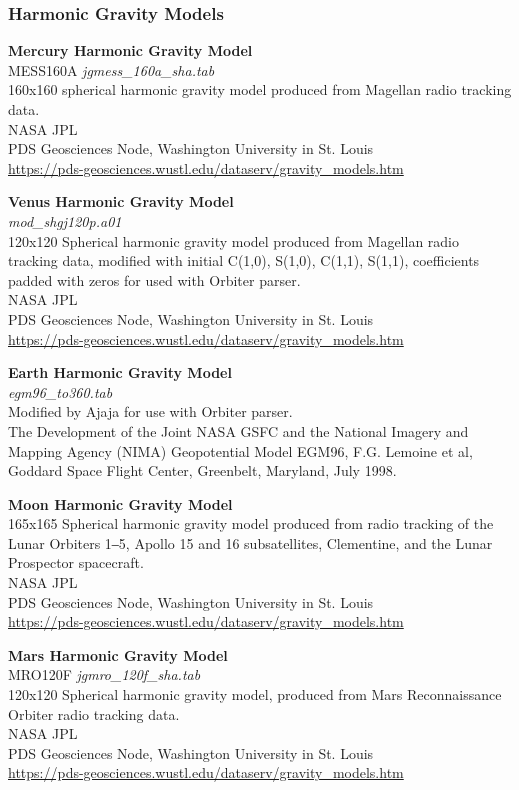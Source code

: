 \documentclass[Orbiter User Manual.tex]{subfiles}
\begin{document}
\subsubsection{Harmonic Gravity Models}
\textbf{Mercury Harmonic Gravity Model}\\
MESS160A	\textit{jgmess\_160a\_sha.tab}\\
160x160 spherical harmonic gravity model produced from Magellan radio tracking
data.\\
NASA JPL\\
PDS Geosciences Node, Washington University in St. Louis\\
\url{https://pds-geosciences.wustl.edu/dataserv/gravity_models.htm}

\textbf{Venus Harmonic Gravity Model}\\
\textit{mod\_shgj120p.a01}\\
120x120 Spherical harmonic gravity model produced from Magellan radio tracking
data, modified with initial C(1,0), S(1,0), C(1,1), S(1,1), coefficients padded
with zeros for used with Orbiter parser.\\
NASA JPL\\
PDS Geosciences Node, Washington University in St. Louis\\
\url{https://pds-geosciences.wustl.edu/dataserv/gravity_models.htm}

\textbf{Earth Harmonic Gravity Model}\\
\textit{egm96\_to360.tab}\\
Modified by Ajaja for use with Orbiter parser.\\
The Development of the Joint NASA GSFC and the National Imagery and Mapping
Agency (NIMA) Geopotential Model EGM96, F.G. Lemoine et al, Goddard Space Flight
Center, Greenbelt, Maryland, July 1998.

\textbf{Moon Harmonic Gravity Model}\\
165x165 Spherical harmonic gravity model produced from radio tracking of the
Lunar Orbiters 1‒5, Apollo 15 and 16 subsatellites, Clementine, and the Lunar
Prospector spacecraft.\\
NASA JPL\\
PDS Geosciences Node, Washington University in St. Louis\\
\url{https://pds-geosciences.wustl.edu/dataserv/gravity_models.htm}

\textbf{Mars Harmonic Gravity Model}\\
MRO120F	\textit{jgmro\_120f\_sha.tab}\\
120x120 Spherical harmonic gravity model, produced from Mars Reconnaissance
Orbiter radio tracking data.\\
NASA JPL\\
PDS Geosciences Node, Washington University in St. Louis\\
\url{https://pds-geosciences.wustl.edu/dataserv/gravity_models.htm}
\end{document}
